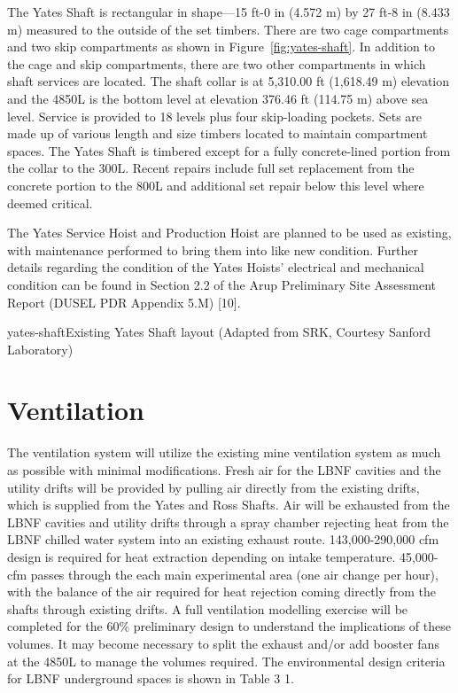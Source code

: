 The Yates Shaft is rectangular in shape—15 ft-0 in (4.572 m) by 27 ft-8 in (8.433 m) measured to the outside of the set timbers. There are two cage compartments and two skip compartments as shown in Figure~\ref{fig:yates-shaft}. In addition to the cage and skip compartments, there are two other compartments in which shaft services are located. The shaft collar is at 5,310.00 ft (1,618.49 m) elevation and the 4850L is the bottom level at elevation 376.46 ft (114.75 m) above sea level. Service is provided to 18 levels plus four skip-loading pockets. Sets are made up of various length and size timbers located to maintain compartment spaces. The Yates Shaft is timbered except for a fully concrete-lined portion from the collar to the 300L. Recent repairs include full set replacement from the concrete portion to the 800L and additional set repair below this level where deemed critical.

The Yates Service Hoist and Production Hoist are planned to be used as existing, with maintenance performed to bring them into like new condition. Further details regarding the condition of the Yates Hoists’ electrical and mechanical condition can be found in Section 2.2 of the Arup Preliminary Site Assessment Report (DUSEL PDR Appendix 5.M) [10].

\begin{cdrfigure}{yates-shaft}{Existing Yates Shaft layout (Adapted from SRK, Courtesy Sanford Laboratory)}
\end{cdrfigure}



\section{Ventilation}
\label{sec:fscf-und-vent}

The ventilation system will utilize the existing mine ventilation system as much as possible with minimal modifications. Fresh air for the LBNF cavities and the utility drifts will be provided by pulling air directly from the existing drifts, which is supplied from the Yates and Ross Shafts. Air will be exhausted from the LBNF cavities and utility drifts through a spray chamber rejecting heat from the LBNF chilled water system into an existing exhaust route. 143,000-290,000 cfm design is required for heat extraction depending on intake temperature. 45,000-cfm passes through the each main experimental area (one air change per hour), with the balance of the air required for heat rejection coming directly from the shafts through existing drifts. A full ventilation modelling exercise will be completed for the 60\% preliminary design to understand the implications of these volumes.  It may become necessary to split the exhaust and/or add booster fans at the 4850L to manage the volumes required. The environmental design criteria for LBNF underground spaces is shown in Table 3 1.

